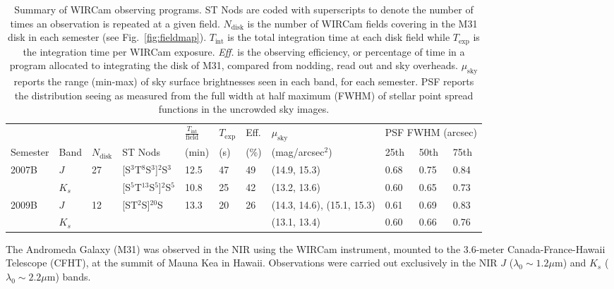 \documentclass[iop]{emulateapj}
\newcommand{\Fig}[1]{Fig.~\ref{fig:#1}}  %
\begin{document}
\begin{table}[t]
\caption[Summary of WIRCam observing programs]{Summary of WIRCam observing programs.
ST Nods are coded with superscripts to denote the number of times an observation is repeated at a given field.
$N_\mathrm{disk}$ is the number of WIRCam fields covering in the M31 disk in each semester (see \Fig{fieldmap}).
$T_\mathrm{int}$ is the total integration time at each disk field while $T_\mathrm{exp}$ is the integration time per WIRCam exposure.
\emph{Eff.} is the observing efficiency, or percentage of time in a program allocated to integrating the disk of M31, compared from nodding, read out and sky overheads.
$\mu_\mathrm{sky}$ reports the range (min-max) of sky surface brightnesses seen in each band, for each semester.
PSF reports the distribution seeing as measured from the full width at half maximum (FWHM) of stellar point spread functions in the uncrowded sky images.}
\label{tab:obssummary}
    
    \centering
    \begin{tabular}{lllllllllll}
        & & & & $\frac{T_\mathrm{int}}{\mathrm{field}}$ & $T_\mathrm{exp}$ & Eff. & $\mu_\mathrm{sky}$ & \multicolumn{3}{c}{PSF FWHM (arcsec)} \\ \cline{9-11}
    Semester & Band & $N_\mathrm{disk}$ & ST Nods & (min) &  (s) &  (\%) & (mag/arcsec$^2$) & 25th  & 50th & 75th \\
    \hline
    \multirow{2}{*}{2007B} & $J$ & \multirow{2}{*}{27} & [S$^3$T$^8$S$^3$]$^{2}$S$^3$ & 12.5 & 47 & 49 & (14.9, 15.3) & 0.68 & 0.75 & 0.84 \\
     & $K_s$ &  & [S$^5$T$^{13}$S$^5$]${^2}$S$^5$ & 10.8 & 25 & 42 & (13.2, 13.6) & 0.60 &  0.65 & 0.73 \\
     \hline
     \multirow{2}{*}{2009B} & $J$ & \multirow{2}{*}{12} & \multirow{2}{*}{[ST$^2$S]$^{20}$S} & \multirow{2}{*}{13.3} & \multirow{2}{*}{20} & \multirow{2}{*}{26} & (14.3, 14.6), (15.1, 15.3) & 0.61 & 0.69 & 0.83 \\
      & $K_s$ & & & & & & (13.1, 13.4) & 0.60 & 0.66 & 0.76 \\
    \end{tabular}
\end{table}

The Andromeda Galaxy (M31) was observed in the NIR using the WIRCam instrument, mounted to the 3.6-meter Canada-France-Hawaii Telescope (CFHT), at the summit of Mauna Kea in Hawaii.
Observations were carried out exclusively in the NIR $J$ ($\lambda_0 \sim 1.2 \mu\mathrm{m}$) and $K_s$ ($\lambda_0 \sim 2.2 \mu\mathrm{m}$) bands.
\end{document}
